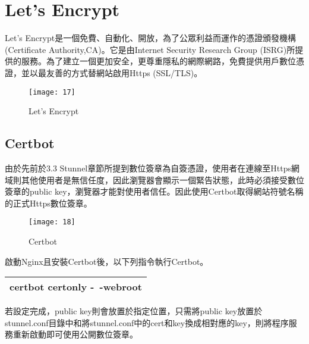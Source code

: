 \renewcommand{\baselinestretch}{20} %
\section{Let's Encrypt}
\par
\renewcommand{\baselinestretch}{1} %
\twelve Let’s Encrypt是一個免費、自動化、開放，為了公眾利益而運作的憑證頒發機構(Certificate Authority,CA)。它是由Internet Security Research Group (ISRG)所提供的服務。為了建立一個更加安全，更尊重隱私的網際網路，免費提供用戶數位憑證，並以最友善的方式替網站啟用Https (SSL/TLS)。
\par
\renewcommand{\baselinestretch}{1.7} %
\begin{figure}[hbt!]
\begin{center}
\texttt{[image: 17]}
\caption{\large Let's Encrypt}\label{fig.Let's Encrypt}
\end{center}
\end{figure}
\par

\renewcommand{\baselinestretch}{20} %
\subsection{Certbot}
\par
\renewcommand{\baselinestretch}{1} %
\twelve 由於先前於3.3 Stunnel章節所提到數位簽章為自簽憑證，使用者在連線至Https網域則其他使用者是無信任度，因此瀏覽器會顯示一個緊告狀態，此時必須接受數位簽章的public key，瀏覽器才能對使用者信任。因此使用Certbot取得網站符號名稱的正式Https數位簽章。
\\
\par
\renewcommand{\baselinestretch}{1.7} %
\begin{figure}[hbt!]
\begin{center}
\texttt{[image: 18]}
\caption{\large Certbot}\label{Certbot}
\end{center}
\end{figure}
\par
\renewcommand{\baselinestretch}{1} %
\twelve 啟動Nginx且安裝Certbot後，以下列指令執行Certbot。
\par
\begin{center}
\begin{tabular}{||p{15cm}|} %
\hline
\textbf{certbot certonly -\ -webroot}
\\
\hline
\end{tabular}
\end{center}
\par
\renewcommand{\baselinestretch}{1} %
\twelve 若設定完成，public key則會放置於指定位置，只需將public key放置於stunnel.conf目錄中和將stunnel.conf中的cert和key換成相對應的key，則將程序服務重新啟動即可使用公開數位簽章。
\par

